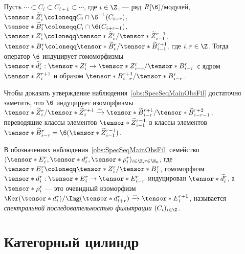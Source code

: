\documentclass[
	extrafontsizes,
	11pt,
	hyphens,
]{memoir}
\begin{document}
\begin{observation}
Пусть
\(
\cdots{} \subset C_{i} \subset C_{i+1} \subset \cdots{}
\),
где \(i \in \Z\),
--- ряд \(R[\6]\)\=/модулей,
\(\tensor*{\widetilde{Z}}{^r_{i}} \coloneqq C_{i} \cap \6^{-1}(C_{i-r})\),
\(\tensor*{\widetilde{B}}{^r_{i}} \coloneqq C_{i} \cap \6(C_{i+r-1})\),
\(\tensor*{Z}{^r_{i}} \coloneqq \tensor*{\widetilde{Z}}{^r_{i}} / \tensor*{\widetilde{Z}}{^{r-1}_{i-1}}\),
\(\tensor*{B}{^r_{i}} \coloneqq \tensor*{\widetilde{B}}{^r_{i}} / \tensor*{\widetilde{B}}{^{r+1}_{i-1}}\),
где \(i, r \in \Z\).%
\label{obs:SpecSeqMainObsFil}
Тогда оператор \(\6\) индуцирует гомоморфизмы
\(
\tensor*{\widetilde{d}}{^r_{i}} :
\tensor*{Z}{^r_{i}}
\to
\tensor*{Z}{^r_{i-r}}
/
\tensor*{B}{^r_{i-r}}
\)
с ядром \(\tensor*{Z}{^{r+1}_{i}}\)
и образом \(\tensor*{B}{^{r+1}_{i-r}} / \tensor*{B}{^r_{i-r}}\).
\end{observation}

\begin{remark}
Чтобы доказать утверждение наблюдения~\ref{obs:SpecSeqMainObsFil} достаточно заметить, что \(\6\) индуцирует изоморфизмы
\(
\tensor*{\widetilde{Z}}{^r_{i}}
/
\tensor*{\widetilde{Z}}{^{r+1}_{i}}
\xrightarrow{\sim}
\tensor*{\widetilde{B}}{^{r+1}_{i-r}}
/
\tensor*{\widetilde{B}}{^{r+2}_{i-r-1}}
\),
переводящие классы элементов
\(\tensor*{\widetilde{Z}}{^{r-1}_{i-1}}\)
в классы элементов
\(\tensor*{\widetilde{B}}{^r_{i-r}} =
\6(\tensor*{\widetilde{Z}}{^{r-1}_{i-1}})\).
\end{remark}

\begin{definition}
В обозначениях%
\label{def:SpecSeqFiltFil}
наблюдения~\ref{obs:SpecSeqMainObsFil}
семейство
\(
(
\tensor*{E}{^r_{i}},
\tensor*{d}{^r_{i}},
\tensor*{\rho}{^r_{i}}
)_{i \in \Z, r \in \N_0}
\),
где
\(\tensor*{E}{^r_{i}} \coloneqq \tensor*{Z}{^r_{i}} / \tensor*{B}{^r_{i}}\),
гомоморфизм
\(
\tensor*{d}{^r_{i}} :
\tensor*{E}{^r_{i}}
\to
\tensor*{E}{^r_{i-r}}
\)
индуцирован
\(\tensor*{\widetilde{d}}{^r_{i}}\),
а
\(
\tensor*{\rho}{^r_{i}}
\)
--- это очевидный изоморфизм
\(
\Ker(\tensor*{d}{^r_{i}})
/
\Img(\tensor*{d}{^r_{i+r}})
\xrightarrow{\sim}
\tensor*{E}{^{r+1}_{i}}
\),
называется \emph{спектральной последовательностью фильтрации} \((C_i)_{i \in \Z}\).
\end{definition}


\section{Категорный цилиндр}
\end{document}
